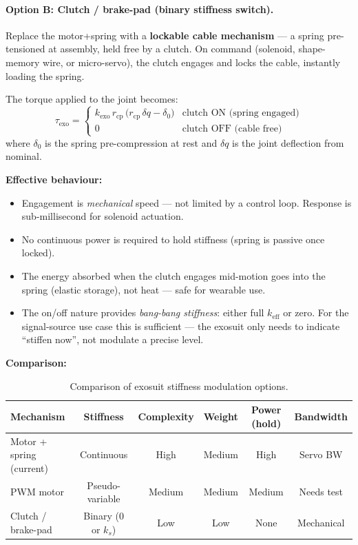 \documentclass[11pt, a4paper]{article}
\begin{document}
\paragraph{Option B: Clutch / brake-pad (binary stiffness switch).}

Replace the motor+spring with a \textbf{lockable cable mechanism} --- a
spring pre-tensioned at assembly, held free by a clutch.  On command
(solenoid, shape-memory wire, or micro-servo), the clutch engages and locks
the cable, instantly loading the spring.

\medskip\noindent
The torque applied to the joint becomes:
%
\begin{equation}\label{eq:clutch-tau}
  \tau_{\text{exo}} =
  \begin{cases}
    k_{\text{exo}}\,r_{\text{cp}}\,\bigl(r_{\text{cp}}\,\delta q - \delta_0\bigr)
      & \text{clutch ON (spring engaged)} \\
    0 & \text{clutch OFF (cable free)}
  \end{cases}
\end{equation}
%
where $\delta_0$ is the spring pre-compression at rest and $\delta q$ is
the joint deflection from nominal.

\medskip\noindent
\textbf{Effective behaviour:}
\begin{itemize}[nosep]
  \item Engagement is \emph{mechanical} speed --- not limited by a
    control loop.  Response is sub-millisecond for solenoid actuation.
  \item No continuous power is required to hold stiffness (spring is
    passive once locked).
  \item The energy absorbed when the clutch engages mid-motion goes into
    the spring (elastic storage), not heat --- safe for wearable use.
  \item The on/off nature provides \emph{bang-bang stiffness}: either full
    $k_{\text{eff}}$ or zero.  For the signal-source use case this is
    sufficient --- the exosuit only needs to indicate ``stiffen now'',
    not modulate a precise level.
\end{itemize}

\medskip\noindent
\textbf{Comparison:}

\begin{table}[ht]
\centering\small
\begin{tabular}{@{}lccccc@{}}
\toprule
\textbf{Mechanism} & \textbf{Stiffness} & \textbf{Complexity}
  & \textbf{Weight} & \textbf{Power (hold)} & \textbf{Bandwidth} \\
\midrule
Motor + spring (current) & Continuous & High & Medium & High & Servo BW \\
PWM motor               & Pseudo-variable & Medium & Medium & Medium & Needs test \\
Clutch / brake-pad      & Binary ($0$ or $k_s$) & Low & Low & None & Mechanical \\
\bottomrule
\end{tabular}
\caption{Comparison of exosuit stiffness modulation options.}
\label{tab:stiffness-options}
\end{table}
\end{document}
